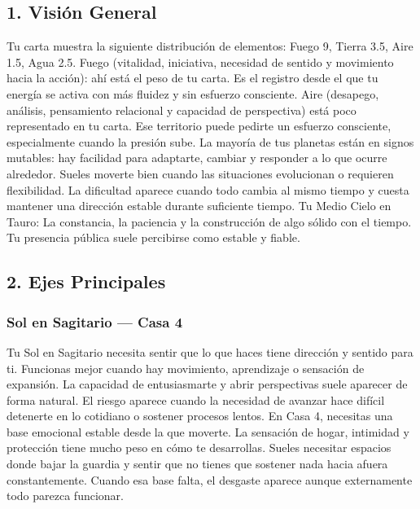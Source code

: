 \documentclass[11pt,a4paper]{article}
\begin{document}
\vspace{0.5cm}

\subsection{1. Visión General}

Tu carta muestra la siguiente distribución de elementos: Fuego 9, Tierra 3.5, Aire 1.5, Agua 2.5. Fuego (vitalidad, iniciativa, necesidad de sentido y movimiento hacia la acción): ahí está el peso de tu carta. Es el registro desde el que tu energía se activa con más fluidez y sin esfuerzo consciente. Aire (desapego, análisis, pensamiento relacional y capacidad de perspectiva) está poco representado en tu carta. Ese territorio puede pedirte un esfuerzo consciente, especialmente cuando la presión sube. La mayoría de tus planetas están en signos mutables: hay facilidad para adaptarte, cambiar y responder a lo que ocurre alrededor. Sueles moverte bien cuando las situaciones evolucionan o requieren flexibilidad. La dificultad aparece cuando todo cambia al mismo tiempo y cuesta mantener una dirección estable durante suficiente tiempo. Tu Medio Cielo en Tauro: La constancia, la paciencia y la construcción de algo sólido con el tiempo. Tu presencia pública suele percibirse como estable y fiable.

\subsection{2. Ejes Principales}

\subsubsection*{Sol en Sagitario — Casa 4}
Tu Sol en Sagitario necesita sentir que lo que haces tiene dirección y sentido para ti. Funcionas mejor cuando hay movimiento, aprendizaje o sensación de expansión. La capacidad de entusiasmarte y abrir perspectivas suele aparecer de forma natural. El riesgo aparece cuando la necesidad de avanzar hace difícil detenerte en lo cotidiano o sostener procesos lentos. En Casa 4, necesitas una base emocional estable desde la que moverte. La sensación de hogar, intimidad y protección tiene mucho peso en cómo te desarrollas. Sueles necesitar espacios donde bajar la guardia y sentir que no tienes que sostener nada hacia afuera constantemente. Cuando esa base falta, el desgaste aparece aunque externamente todo parezca funcionar.
\end{document}

